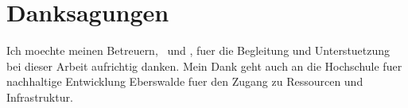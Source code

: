 \chapter*{Danksagungen}

Ich moechte meinen Betreuern, \thesisFirstSupervisor\ und
\thesisSecondSupervisor, fuer die Begleitung und Unterstuetzung bei dieser
Arbeit aufrichtig danken. Mein Dank geht auch an die Hochschule fuer
nachhaltige Entwicklung Eberswalde fuer den Zugang zu Ressourcen und
Infrastruktur.
